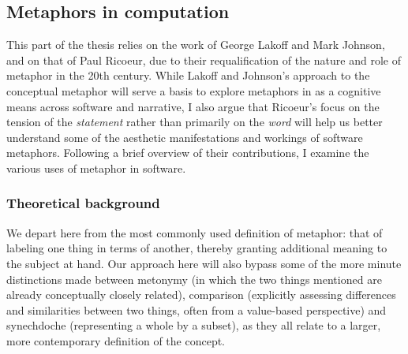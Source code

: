 \subsection{Metaphors in computation}
\label{subsec:metaphor-computation}

This part of the thesis relies on the work of George Lakoff and Mark Johnson, and on that of Paul Ricoeur, due to their requalification of the nature and role of metaphor in the 20th century. While Lakoff and Johnson's approach to the conceptual metaphor will serve a basis to explore metaphors in as a cognitive means across software and narrative, I also argue that Ricoeur's focus on the tension of the \emph{statement} rather than primarily on the \emph{word} will help us better understand some of the aesthetic manifestations and workings of software metaphors. Following a brief overview of their contributions, I examine the various uses of metaphor in software.

\subsubsection{Theoretical background}
\label{subsubsec:metaphors-background}


We depart here from the most commonly used definition of metaphor: that of labeling one thing in terms of another, thereby granting additional meaning to the subject at hand. Our approach here will also bypass some of the more minute distinctions made between metonymy (in which the two things mentioned are already conceptually closely related), comparison (explicitly assessing differences and similarities between two things, often from a value-based perspective) and synechdoche (representing a whole by a subset), as they all relate to a larger, more contemporary definition of the concept.

